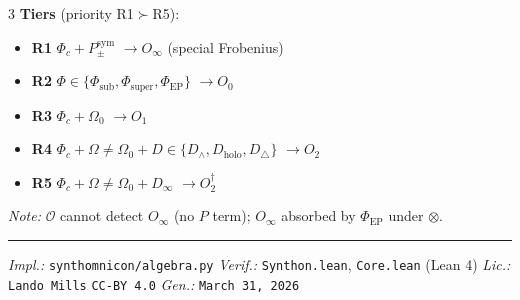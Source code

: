 \documentclass[8pt,a4paper,landscape]{article}
\begin{document}
\begin{multicols}{3}
\textbf{Tiers} (priority R1$\succ$R5):
\begin{itemize}[leftmargin=*,nosep,topsep=2pt,itemsep=1pt]
\item \textbf{R1} $\Phi_c+P_\pm^{\text{sym}}$ $\to O_\infty$ (special Frobenius)
\item \textbf{R2} $\Phi\in\{\Phi_{\text{sub}},\Phi_{\text{super}},\Phi_{\text{EP}}\}$ $\to O_0$
\item \textbf{R3} $\Phi_c+\Omega_0$ $\to O_1$
\item \textbf{R4} $\Phi_c+\Omega{\neq}\Omega_0+D\in\{D_\wedge,D_{\text{holo}},D_\triangle\}$ $\to O_2$
\item \textbf{R5} $\Phi_c+\Omega{\neq}\Omega_0+D_\infty$ $\to O_2^\dagger$
\end{itemize}
\textit{Note:} $\mathcal{O}$ cannot detect $O_\infty$ (no $P$ term); $O_\infty$ absorbed by $\Phi_{\text{EP}}$ under $\otimes$.

\end{multicols}

\vfill
\noindent\hrule
\vspace{0.1em}
\noindent\footnotesize
\textit{Impl.:} \texttt{synthomnicon/algebra.py} \quad
\textit{Verif.:} \texttt{Synthon.lean}, \texttt{Core.lean} (Lean 4) \quad
\textit{Lic.:} \texttt{Lando Mills} \texttt{CC-BY 4.0} \quad
\textit{Gen.:} \texttt{March 31, 2026} \quad
\end{document}
